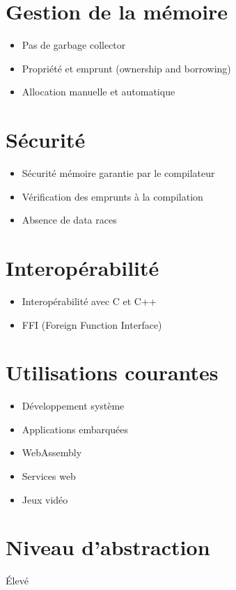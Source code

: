 \documentclass{article}
\begin{document}
\section{Gestion de la mémoire}
\begin{itemize}
    \item Pas de garbage collector
    \item Propriété et emprunt (ownership and borrowing)
    \item Allocation manuelle et automatique
\end{itemize}

\section{Sécurité}
\begin{itemize}
    \item Sécurité mémoire garantie par le compilateur
    \item Vérification des emprunts à la compilation
    \item Absence de data races
\end{itemize}

\section{Interopérabilité}
\begin{itemize}
    \item Interopérabilité avec C et C++
    \item FFI (Foreign Function Interface)
\end{itemize}

\section{Utilisations courantes}
\begin{itemize}
    \item Développement système
    \item Applications embarquées
    \item WebAssembly
    \item Services web
    \item Jeux vidéo
\end{itemize}

\section{Niveau d'abstraction}
Élevé
\end{document}
